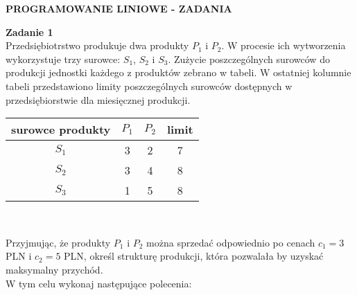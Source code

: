 \documentclass[11pt]{article}
\begin{document}
\begin{center}\large{ \textbf{PROGRAMOWANIE LINIOWE - ZADANIA}} \end{center}

\textbf{Zadanie 1}\\
Przedsiębiotrstwo produkuje dwa produkty $P_1$ i $P_2$. W procesie ich wytworzenia wykorzystuje trzy surowce: $S_1$, $S_2$ i $S_3$.
Zużycie poszczególnych surowców do produkcji jednostki każdego z produktów zebrano w tabeli. W ostatniej kolumnie tabeli przedstawiono limity poszczególnych surowców dostępnych w przedsiębiorstwie dla miesięcznej produkcji.


\begin{center}
\begin{tabular}{|c||c|c||c|}

\hline
surowce  produkty&$P_1$&$P_2$&limit\\
\hline
\hline
$S_1$&3&2&7\\
$S_2$&3&4&8\\
$S_3$&1&5&8\\
\hline
\end{tabular}\\
\end{center}
Przyjmując, że produkty $P_1$ i $P_2$ można sprzedać odpowiednio po cenach $c_1=3$ PLN i $c_2=5$ PLN, określ strukturę produkcji, która pozwalała by uzyskać maksymalny przychód.\\
W tym celu wykonaj następujące polecenia:
\end{document}
